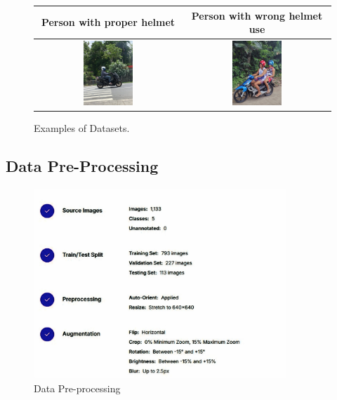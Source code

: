\begin{refsection}
\begin{refsection}
\begin{figure}[H]
\begin{tabular}{|c|c|}
\hline
Person with proper helmet & Person with wrong helmet use \\
\hline
\includegraphics[width=0.35\textwidth]{figures/Fig 10.png} & 
\includegraphics[width=0.35\textwidth]{figures/Fig 11.png} \\
\hline
\end{tabular}

\caption{Examples of Datasets.}
\label{fig:helmet_classification}
\end{figure}

\subsection{Data Pre-Processing}

\begin{figure}[ht]
    \centering
	\includegraphics[width=0.85\textwidth]{figures/Fig 12.jpg}
	\caption[Data Pre-processing]{Data Pre-processing}
	\label{fig:data_preprocessing}
\end{figure}


\end{refsection}
\end{refsection}
